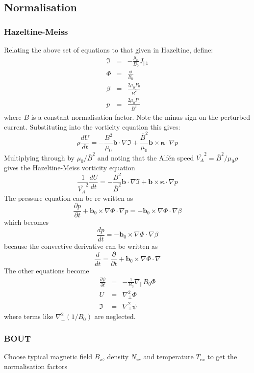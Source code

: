 \documentclass[12pt, a4paper]{article}
\newcommand{\deriv}[2]{\ensuremath{\frac{\partial #1}{\partial #2}}}
\newcommand{\Vec}[1]{\ensuremath{\mathbf{#1}}}
\newcommand{\bvec}{\Vec{b}}
\newcommand{\kvec}{\Vec{\kappa}}
\newcommand{\bxk}{\bvec\times\kvec\cdot\nabla}
\newcommand{\Bbar}{\overline{B}}
\newcommand{\delp}{\nabla_\perp^2}
\begin{document}
\subsection{Normalisation}

\subsubsection{Hazeltine-Meiss}

Relating the above set of equations to that given in Hazeltine, define:
\begin{eqnarray*}
\Im &=& -\frac{\mu_0}{B_0}J_{||1} \\
\Phi &=& \frac{\phi}{B_0} \\
\beta &=& \frac{2\mu_0 P_0}{\Bbar^2} \\
p &=& \frac{2\mu_0 P_1}{\Bbar^2}
\end{eqnarray*}
where $\Bbar$ is a constant normalisation factor.
Note the minus sign on the perturbed current. Substituting into the vorticity equation this gives:
\[
\rho \frac{dU}{dt} = -\frac{B^2}{\mu_0}\bvec\cdot\nabla\Im + \frac{\Bbar^2}{\mu_0}\bxk p
\]
Multiplying through by $\mu_0/\Bbar^2$ and noting that the Alf\'en speed $\overline{V_A}^2 = \Bbar^2 / \mu_0\rho$
gives the Hazeltine-Meiss vorticity equation
\[
\frac{1}{\overline{V_A}^2} \frac{dU}{dt} = -\frac{B^2}{\Bbar^2}\bvec\cdot\nabla\Im + \bxk p 
\]
The pressure equation can be re-written as
\[
\deriv{p}{t} + \bvec_0\times\nabla\Phi\cdot\nabla p = -\bvec_0\times\nabla\Phi\cdot\nabla\beta
\]
which becomes
\[
\frac{dp}{dt} = -\bvec_0\times\nabla\Phi\cdot\nabla\beta
\]
because the convective derivative can be written as
\[
\frac{d}{dt} = \deriv{}{t} + \bvec_0\times\nabla\Phi\cdot\nabla
\]
The other equations become
\begin{eqnarray*}
\deriv{\psi}{t} &=& -\frac{1}{B_0}\nabla_{||}B_0\Phi \\
U &=& \delp\Phi \\
\Im &=& \delp\psi 
\end{eqnarray*}
where terms like $\delp\left(1 / B_0\right)$ are neglected.

\subsubsection{BOUT}

Choose typical magnetic field $B_x$, density $N_{ix}$ and temperature $T_{ex}$
to get the normalisation factors
\end{document}
